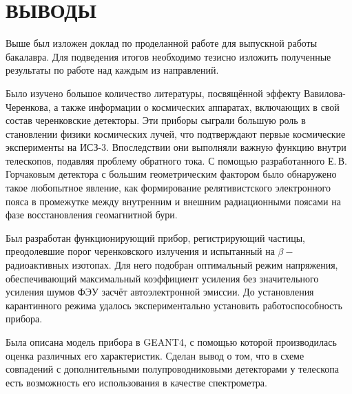 \documentclass[12pt,a4paper]{report} %
\begin{document}
\chapter*{ВЫВОДЫ}

Выше был изложен доклад по проделанной работе для выпускной работы бакалавра. Для подведения итогов необходимо тезисно изложить полученные результаты по работе над каждым из направлений.

Было изучено большое количество литературы, посвящённой эффекту Вавилова-Черенкова, а также информации о космических аппаратах, включающих в свой состав черенковские детекторы. Эти приборы сыграли большую роль в становлении физики космических лучей, что подтверждают первые космические эксперименты на ИСЗ-3. Впоследствии они выполняли важную функцию внутри телескопов, подавляя проблему обратного тока.
С помощью разработанного Е.\,В. Горчаковым детектора с большим геометрическим фактором было обнаружено такое любопытное явление, как формирование релятивистского электронного пояса в промежутке между внутренним и внешним радиационными поясами на фазе восстановления геомагнитной бури. 

Был разработан функционирующий прибор, регистрирующий частицы, преодолевшие порог черенковского излучения и испытанный на $\beta-$радиоактивных изотопах. Для него подобран оптимальный режим напряжения, обеспечивающий максимальный коэффициент усиления без значительного усиления шумов ФЭУ засчёт автоэлектронной эмиссии. До установления карантинного режима удалось экспериментально установить работоспособность прибора. 

Была описана модель прибора в GEANT4, с помощью которой производилась оценка различных его характеристик. Сделан вывод о том, что в схеме совпадений с дополнительными полупроводниковыми детекторами у телескопа есть возможность его использования в качестве спектрометра.	
\end{document}
